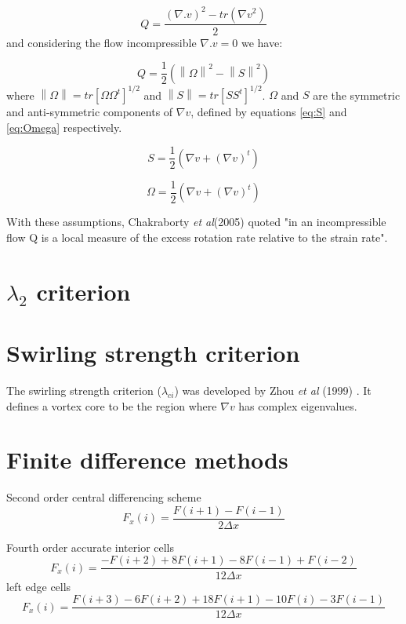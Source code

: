 \documentclass[12pt, a4paper, openany]{memoir}
\newcommand{\norm}[1]{\left\lVert#1\right\rVert}
\begin{document}
\begin{equation}
Q = \frac{(\nabla . v)^2 - tr(\nabla v^2)}{2}
\end{equation}
and considering the flow incompressible $\nabla . v = 0$ we have:

\begin{equation}
Q = \frac{1}{2} (\norm{\Omega}^2 - \norm{S}^2)
\end{equation}
where $\norm{\Omega} = tr[\Omega \Omega^t]^{1/2}$ and $\norm{S} = tr[S S^t]^{1/2}$. $\Omega$ and $S$ are the symmetric and anti-symmetric components of $\nabla v$, defined by equations \ref{eq:S} and \ref{eq:Omega} respectively.

\begin{equation}
\label{eq:S}
S = \frac{1}{2} (\nabla v + (\nabla v)^t)
\end{equation}

\begin{equation}
\label{eq:Omega}
\Omega = \frac{1}{2} (\nabla v + (\nabla v)^t)
\end{equation}

With these assumptions, Chakraborty \textit{et al}(2005) \cite{chakra2005} quoted "in an incompressible flow Q is a local measure of the excess
rotation rate relative to the strain rate".


\section{$\lambda_2$ criterion}

\section{Swirling strength criterion}

The swirling strength criterion ($\lambda_{ci}$) was developed by Zhou \textit{et al} (1999) \cite{zhou1999}. It defines a vortex core to be the region where $\nabla v$ has complex eigenvalues. 

\section{Finite difference methods}

Second order central differencing scheme
\begin{equation}
F_x(i) = \frac{F(i+1)-F(i-1)}{2 \Delta x}
\end{equation}

Fourth order accurate
interior cells 
\begin{equation}
F_x(i) = \frac{-F(i+2)+8F(i+1)-8F(i-1)+F(i-2)}{12 \Delta x}
\end{equation}
left edge cells
\begin{equation}
F_x(i) = \frac{F(i+3)-6F(i+2)+18F(i+1)-10F(i) -3F(i-1)}{12 \Delta x}
\end{equation}
\end{document}
